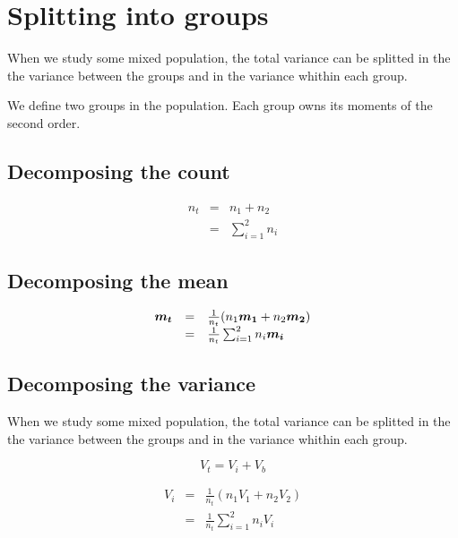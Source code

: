 \documentclass{article}
\begin{document}
\section{Splitting into groups}
When we study some mixed population, the total variance can be splitted in the
the variance between the groups and in the variance whithin each group.

We define two groups in the population. Each group owns its moments of the 
second order.

\subsection{Decomposing the count}

$$
\begin{array}{lcl}
n_t & = & n_1 + n_2 \\
    & = & \sum_{i=1}^{2} n_i
\end{array}
$$


\subsection{Decomposing the mean}

$$
\begin{array}{lcl}
\mbox{\boldmath$m_t$} & = & 
 \frac{1}{n_t}(n_1 \mbox{\boldmath$m_1$} + n_2 \mbox{\boldmath$m_2$}) \\
                      & = &
 \frac{1}{n_t}\sum_{i=1}^{2} n_i \mbox{\boldmath$m_i$}
\end{array}
$$


\subsection{Decomposing the variance}
When we study some mixed population, the total variance can be splitted in the
the variance between the groups and in the variance whithin each group.

$$
V_t = V_i + V_b
$$

$$
\begin{array}{lcl}
V_i & = & \frac{1}{n_t}(n_1 V_1 + n_2 V_2) \\
    & = & \frac{1}{n_t}\sum_{i=1}^2 n_i V_i
\end{array}
$$
\end{document}
